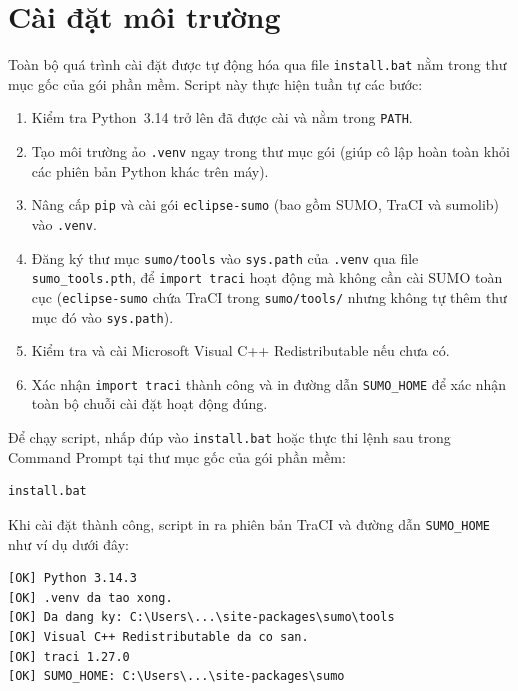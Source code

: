 \documentclass[../DoAn.tex]{subfiles}
\begin{document}
\section{Cài đặt môi trường}
\label{sec:pla-caidat}

Toàn bộ quá trình cài đặt được tự động hóa qua file \texttt{install.bat}
nằm trong thư mục gốc của gói phần mềm.
Script này thực hiện tuần tự các bước:
\begin{enumerate}
    \item Kiểm tra Python~3.14 trở lên đã được cài và nằm trong \texttt{PATH}.
    \item Tạo môi trường ảo \texttt{.venv} ngay trong thư mục gói (giúp cô lập
          hoàn toàn khỏi các phiên bản Python khác trên máy).
    \item Nâng cấp \texttt{pip} và cài gói \texttt{eclipse-sumo}
          (bao gồm SUMO, TraCI và sumolib) vào \texttt{.venv}.
    \item Đăng ký thư mục \texttt{sumo/tools} vào \texttt{sys.path} của \texttt{.venv}
          qua file \texttt{sumo\_tools.pth}, để \texttt{import traci} hoạt động
          mà không cần cài SUMO toàn cục
          (\texttt{eclipse-sumo} chứa TraCI trong \texttt{sumo/tools/}
          nhưng không tự thêm thư mục đó vào \texttt{sys.path}).
    \item Kiểm tra và cài Microsoft Visual C++ Redistributable nếu chưa có.
    \item Xác nhận \texttt{import traci} thành công và in đường dẫn
          \texttt{SUMO\_HOME} để xác nhận toàn bộ chuỗi cài đặt hoạt động
          đúng.
\end{enumerate}

Để chạy script, nhấp đúp vào \texttt{install.bat} hoặc thực thi lệnh sau
trong Command Prompt tại thư mục gốc của gói phần mềm:

\begin{lstlisting}[style=cmd]
install.bat
\end{lstlisting}

Khi cài đặt thành công, script in ra phiên bản TraCI và đường dẫn
\texttt{SUMO\_HOME} như ví dụ dưới đây:

\begin{lstlisting}[style=cmd]
[OK] Python 3.14.3
[OK] .venv da tao xong.
[OK] Da dang ky: C:\Users\...\site-packages\sumo\tools
[OK] Visual C++ Redistributable da co san.
[OK] traci 1.27.0
[OK] SUMO_HOME: C:\Users\...\site-packages\sumo
\end{lstlisting}
\end{document}

